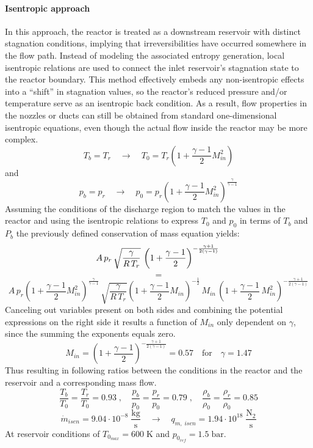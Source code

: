 \paragraph{Isentropic approach}
	In this approach, the reactor is treated as a downstream reservoir with distinct stagnation conditions, implying that irreversibilities have occurred somewhere in the flow path.
	Instead of modeling the associated entropy generation, local isentropic relations are used to connect the inlet reservoir’s stagnation state to the reactor boundary.
	This method effectively embeds any non-isentropic effects into a “shift” in stagnation values, so the reactor’s reduced pressure and/or temperature serve as an isentropic back condition.
	As a result, flow properties in the nozzles or ducts can still be obtained from standard one-dimensional isentropic equations, even though the actual flow inside the reactor may be more complex.
	$$
		T_b = T_r
		\quad \to \quad
		T_0 = T_r \left(1 + \frac{\gamma - 1}{2}M_{in}^2 \right)
	$$
	and
	$$
		p_b = p_r
		\quad \to \quad
		p_0 = p_r \left(1 + \frac{\gamma - 1}{2}M_{in}^2 \right)^{\frac{\gamma}{\gamma - 1}}
	$$
	\newpage
	Assuming the conditions of the discharge region to match the values in the reactor and using the isentropic relations to express $T_0$ and $p_0$ in terms of $T_b$ and $P_b$ the previously defined conservation of mass equation yields:
	$$
		A\, p_r\, \sqrt{\frac{\gamma}{R\,T_r}}\,\left(1+\frac{\gamma-1}{2}\right)^{-\frac{\gamma+1}{2(\gamma-1)}}\\
	$$
	$$
		=
	$$
	$$
		A\, p_r\left(1 + \frac{\gamma - 1}{2}M_{in}^2\right)^{\frac{\gamma}{\gamma-1}}\, \sqrt{\frac{\gamma}{R\,T_r}}\left(1 + \frac{\gamma - 1}{2}M_{in}\right)^{-\frac{1}{2}}\, M_{in}\,\left(1+\frac{\gamma-1}{2}\,M_{in}^2\right)^{-\frac{\gamma+1}{2(\gamma-1)}}
	$$
	Canceling out variables present on both sides and combining the potential expressions on the right side it results a function of $M_{in}$ only dependent on $\gamma$, since the summing the exponents equals zero.
	$$
		M_{in} = \left(1 + \frac{\gamma - 1}{2}\right)^{-\frac{\gamma + 1}{2(\gamma - 1)}}= 0.57
		\quad \text{for} \quad \gamma = 1.47
	$$
	Thus resulting in following ratios between the conditions in the reactor and the reservoir and a corresponding mass flow.
	$$
		\frac{T_b}{T_0} = \frac{T_r}{T_0} = 0.93\;,
			\quad
		\frac{p_b}{p_0} = \frac{p_r}{p_0} = 0.79\;,
			\quad
		\frac{\rho_b}{\rho_0} = \frac{\rho_r}{\rho_0} = 0.85
	$$
	$$
		\dot{m}_{isen} = 9.04 \cdot 10^{-8}\; \frac{\text{kg}}{\text{s}}
			\quad \rightarrow \quad
		q_{m,\;isen} = 1.94 \cdot 10^{18}\; \frac{\text{N}_2}{\text{s}} 
	$$
	At reservoir conditions of $T_{0_{max}} = 600\;\text{K}$ and $p_{0_{ref}} = 1.5\;\text{bar}$.

